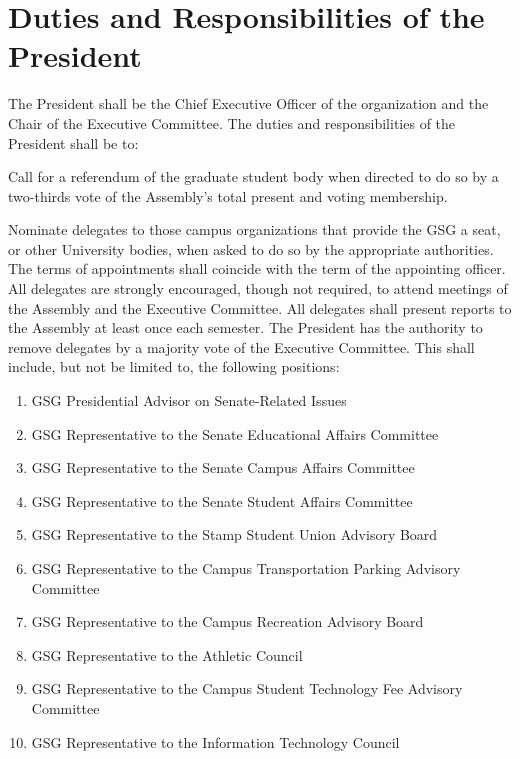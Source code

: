 \section{Duties and Responsibilities of the President}
\begin{bylaws-number}
  \item The President shall be the Chief Executive Officer of the organization and the Chair of the Executive Committee. The duties and responsibilities of the President shall be to:
  \begin{bylaws-number}
    \item Call for a referendum of the graduate student body when directed to do so by a two-thirds vote of the Assembly’s total present and voting membership.
    \item Nominate delegates to those campus organizations that provide the GSG a seat, or other University bodies, when asked to do so by the appropriate authorities. The terms of appointments shall coincide with the term of the appointing officer. All delegates are strongly encouraged, though not required, to attend meetings of the Assembly and the Executive Committee. All delegates shall present reports to the Assembly at least once each semester. The President has the authority to remove delegates by a majority vote of the Executive Committee. This shall include, but not be limited to, the following positions:
    \begin{enumerate}[i]
      \item GSG Presidential Advisor on Senate-Related Issues
      \item GSG Representative to the Senate Educational Affairs Committee
      \item GSG Representative to the Senate Campus Affairs Committee
      \item GSG Representative to the Senate Student Affairs Committee
      \item GSG Representative to the Stamp Student Union Advisory Board
      \item GSG Representative to the Campus Transportation Parking Advisory Committee
      \item GSG Representative to the Campus Recreation Advisory Board
      \item GSG Representative to the Athletic Council
      \item GSG Representative to the Campus Student Technology Fee Advisory Committee
      \item GSG Representative to the Information Technology Council

\end{enumerate}
\end{bylaws-number}
\end{bylaws-number}
